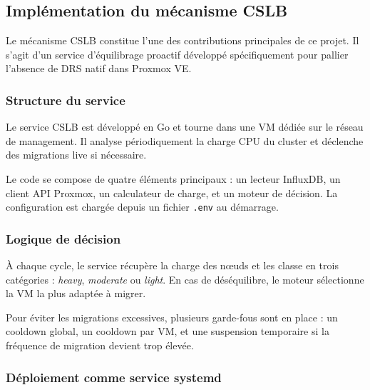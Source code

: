 \subsection{Implémentation du mécanisme CSLB}

\par Le mécanisme CSLB constitue l'une des contributions principales de ce projet. Il s'agit d'un service d'équilibrage proactif développé spécifiquement pour pallier l'absence de DRS natif dans Proxmox VE.

\subsubsection{Structure du service}

\par Le service CSLB est développé en Go et tourne dans une VM dédiée sur le réseau de management. Il analyse périodiquement la charge CPU du cluster et déclenche des migrations live si nécessaire.\\

\par Le code se compose de quatre éléments principaux : un lecteur InfluxDB, un client API Proxmox, un calculateur de charge, et un moteur de décision. La configuration est chargée depuis un fichier \texttt{.env} au démarrage.\\

\subsubsection{Logique de décision}

\par À chaque cycle, le service récupère la charge des nœuds et les classe en trois catégories : \textit{heavy}, \textit{moderate} ou \textit{light}. En cas de déséquilibre, le moteur sélectionne la VM la plus adaptée à migrer.\\

\par Pour éviter les migrations excessives, plusieurs garde-fous sont en place : un cooldown global, un cooldown par VM, et une suspension temporaire si la fréquence de migration devient trop élevée.\\

\subsubsection{Déploiement comme service systemd}

